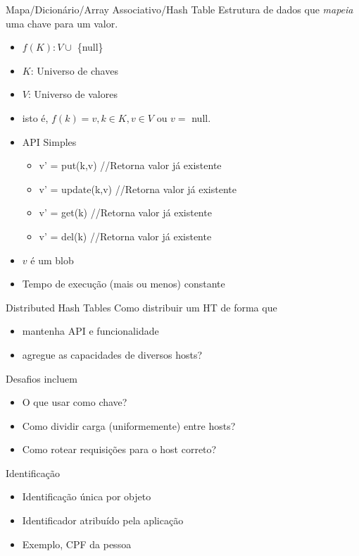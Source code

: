 \begin{frame}[fragile]{Mapa/Dicionário/Array Associativo/Hash Table}
Estrutura de dados que \emph{mapeia} uma chave para um valor.
\begin{itemize}
	\item $f(K): V \cup$ \{null\}
	\item $K$: Universo de chaves
	\item $V$: Universo de valores
	\item isto é, $f(k) = v, k\in K, v \in V$ ou $v =$ null.

\pause
	
	\item API Simples
	\begin{itemize}
		\item v' = put(k,v) //Retorna valor já existente
		\item v' = update(k,v) //Retorna valor já existente
		\item v' = get(k) //Retorna valor já existente
		\item v' = del(k) //Retorna valor já existente
	\end{itemize}
	\item $v$ é um blob
	\item Tempo de execução (mais ou menos) constante
\end{itemize}
\end{frame}

\begin{frame}{Distributed Hash Tables}
Como distribuir um HT de forma que
\begin{itemize}
\item mantenha API e funcionalidade
\item agregue as capacidades de diversos hosts?
\end{itemize}

Desafios incluem
\begin{itemize}
\item O que usar como chave?
\item Como dividir carga (uniformemente) entre hosts?
\item Como rotear requisições para o host correto?
\end{itemize}
\end{frame}


\begin{frame}{Identificação}
\begin{itemize}
	\item Identificação única por objeto
	\item Identificador atribuído pela aplicação
	\item Exemplo, CPF da pessoa
\end{itemize}
\end{frame}

